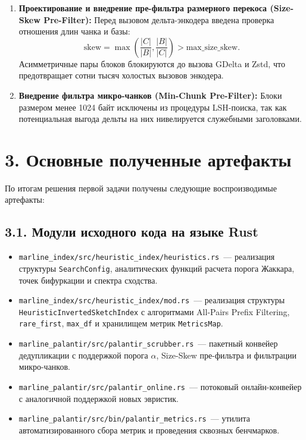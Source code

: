 \documentclass[a4paper,14pt]{extarticle}
\begin{document}
\begin{enumerate}
    \item \textbf{Проектирование и внедрение пре-фильтра размерного перекоса (Size-Skew Pre-Filter):}
    Перед вызовом дельта-энкодера введена проверка отношения длин чанка и базы:
    \begin{equation}
        \text{skew} = \max\left(\frac{|C|}{|B|}, \frac{|B|}{|C|}\right) > \text{max\_size\_skew}.
    \end{equation}
    Асимметричные пары блоков блокируются до вызова GDelta и Zstd, что предотвращает сотни тысяч холостых вызовов энкодера.

    \item \textbf{Внедрение фильтра микро-чанков (Min-Chunk Pre-Filter):}
    Блоки размером менее 1024 байт исключены из процедуры LSH-поиска, так как потенциальная выгода дельты на них нивелируется служебными заголовками.
\end{enumerate}

\section*{3. Основные полученные артефакты}

По итогам решения первой задачи получены следующие воспроизводимые артефакты:

\subsection*{3.1. Модули исходного кода на языке Rust}
\begin{itemize}
    \item \texttt{marline\_index/src/heuristic\_index/heuristics.rs}~--- реализация структуры \texttt{SearchConfig}, аналитических функций расчета порога Жаккара, точек бифуркации и спектра сходства.
    \item \texttt{marline\_index/src/heuristic\_index/mod.rs}~--- реализация структуры \texttt{HeuristicInvertedSketchIndex} с алгоритмами All-Pairs Prefix Filtering, \texttt{rare\_first}, \texttt{max\_df} и хранилищем метрик \texttt{MetricsMap}.
    \item \texttt{marline\_palantir/src/palantir\_scrubber.rs}~--- пакетный конвейер дедупликации с поддержкой порога $\alpha$, Size-Skew пре-фильтра и фильтрации микро-чанков.
    \item \texttt{marline\_palantir/src/palantir\_online.rs}~--- потоковый онлайн-конвейер с аналогичной поддержкой новых эвристик.
    \item \texttt{marline\_palantir/src/bin/palantir\_metrics.rs}~--- утилита автоматизированного сбора метрик и проведения сквозных бенчмарков.
\end{itemize}
\end{document}
